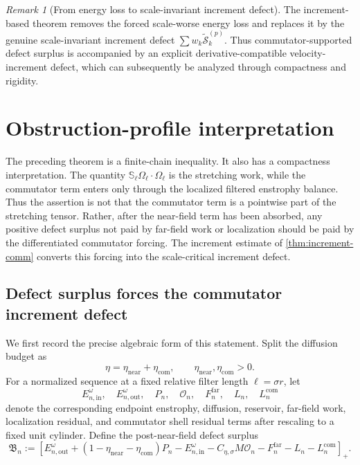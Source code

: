 \documentclass[11pt]{article}
\numberwithin{equation}{section}
\theoremstyle{plain}
\theoremstyle{definition}
\theoremstyle{remark}
\newtheorem{remark}[theorem]{Remark}
\begin{document}
\begin{remark}[From energy loss to scale-invariant increment defect]\label{rem:compare-increment-energy}
The increment-based theorem removes the forced scale-worse energy loss and replaces it by the genuine scale-invariant increment defect $\sum w_k\widetilde{\mathcal S}_k^{(p)}$.  Thus commutator-supported defect surplus is accompanied by an explicit derivative-compatible velocity-increment defect, which can subsequently be analyzed through compactness and rigidity.
\end{remark}


\section{Obstruction-profile interpretation}\label{sec:obstruction}

The preceding theorem is a finite-chain inequality.  It also has a compactness interpretation.  The quantity $\mathbb S_\ell\Omega_\ell\cdot\Omega_\ell$ is the stretching work, while the commutator term enters only through the localized filtered enstrophy balance.  Thus the assertion is not that the commutator term is a pointwise part of the stretching tensor.  Rather, after the near-field term has been absorbed, any positive defect surplus not paid by far-field work or localization should be paid by the differentiated commutator forcing.  The increment estimate of \cref{thm:increment-comm} converts this forcing into the scale-critical increment defect.

\subsection{Defect surplus forces the commutator increment defect}

We first record the precise algebraic form of this statement.  Split the diffusion budget as
\[
\eta=\eta_{\mathrm{near}}+\eta_{\mathrm{com}},
\qquad
\eta_{\mathrm{near}},\eta_{\mathrm{com}}>0.
\]
For a normalized sequence at a fixed relative filter length $\ell=\sigma r$, let
\[
E_{n,\mathrm{in}}^\omega,
\quad
E_{n,\mathrm{out}}^\omega,
\quad
P_n,
\quad
\mathcal O_n,
\quad
F_n^{\mathrm{far}},
\quad
L_n,
\quad
L_n^{\mathrm{com}}
\]
denote the corresponding endpoint enstrophy, diffusion, reservoir, far-field work, localization residual, and commutator shell residual terms after rescaling to a fixed unit cylinder.  Define the post-near-field defect surplus
\begin{equation}\label{eq:defect-surplus-B}
\mathfrak B_n
:=
\left[
E_{n,\mathrm{out}}^\omega
+
(1-\eta_{\mathrm{near}}-\eta_{\mathrm{com}})P_n
-
E_{n,\mathrm{in}}^\omega
-
C_{\eta,\sigma}M\mathcal O_n
-
F_n^{\mathrm{far}}
-
L_n
-
L_n^{\mathrm{com}}
\right]_+ .
\end{equation}
\end{document}
